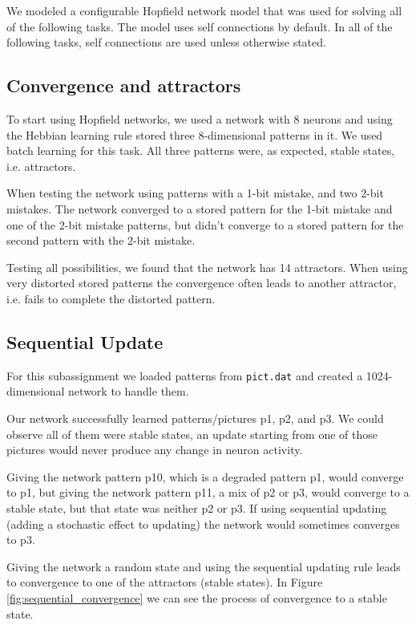 \documentclass[a4paper]{article}
\begin{document}
We modeled a configurable Hopfield network model that was used for solving all of the following tasks. The model uses self connections by default. In all of the following tasks, self connections are used unless otherwise stated.

\subsection{Convergence and attractors}
To start using Hopfield networks, we used a network with 8 neurons and using the Hebbian learning rule stored three 8-dimensional patterns in it. We used batch learning for this task. All three patterns were, as expected, stable states, i.e. attractors.

When testing the network using patterns with a 1-bit mistake, and two 2-bit mistakes. The network converged to a stored pattern for the 1-bit mistake and one of the 2-bit mistake patterns, but didn't converge to a stored pattern for the second pattern with the 2-bit mistake.

Testing all possibilities, we found that the network has 14 attractors. When using very distorted stored patterns the convergence often leads to another attractor, i.e. fails to complete the distorted pattern.

\subsection{Sequential Update}
For this subassignment we loaded patterns from \texttt{pict.dat} and created a 1024-dimensional network to handle them. 

Our network successfully learned patterns/pictures p1, p2, and p3. We could observe all of them were stable states, an update starting from one of those pictures would never produce any change in neuron activity.

Giving the network pattern p10, which is a degraded pattern p1, would converge to p1, but giving the network pattern p11, a mix of p2 or p3, would converge to a stable state, but that state was neither p2 or p3. If using sequential updating (adding a stochastic effect to updating) the network would sometimes converges to p3.

Giving the network a random state and using the sequential updating rule leads to convergence to one of the attractors (stable states). In Figure \ref{fig:sequential_convergence} we can see the process of convergence to a stable state.
\end{document}
